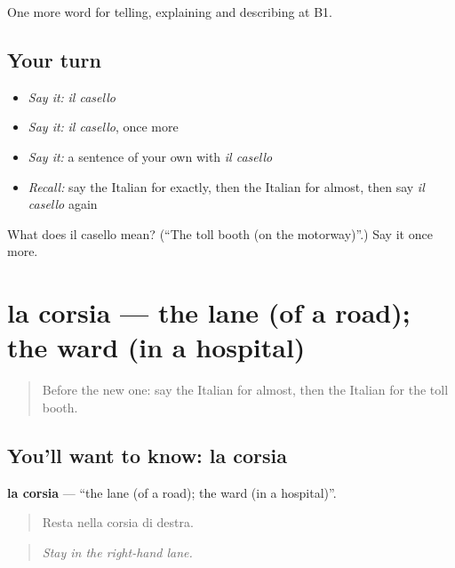 \begin{grammarlens}[title={What you've built}]
One more word for telling, explaining and describing at B1.
\end{grammarlens}

\subsection*{Your turn}
\begin{itemize}
\raggedright
  \item \emph{Say it:} \emph{il casello}
  \item \emph{Say it:} \emph{il casello}, once more
  \item \emph{Say it:} a sentence of your own with \emph{il casello}
  \item \emph{Recall:} say the Italian for exactly, then the Italian for almost, then say \emph{il casello} again
\end{itemize}

\begin{tcolorbox}[breakable,colback=teal!4,colframe=teal!35!black,title={Before you move on}]
What does il casello mean? (\textquotedblleft{}The toll booth (on the motorway)\textquotedblright{}.) Say it once more.
\end{tcolorbox}
\section[la corsia]{la corsia — the lane (of a road); the ward (in a hospital)}

\label{lesson:IT-C405-corsia}



\begin{quote}
Before the new one: say the Italian for almost, then the Italian for the toll booth.
\end{quote}

\subsection*{You'll want to know: la corsia}
\textbf{la corsia} — \textquotedblleft{}the lane (of a road); the ward (in a hospital)\textquotedblright{}.

\begin{quote}
Resta nella corsia di destra.
\end{quote}

\begin{quote}
\emph{Stay in the right-hand lane.}
\end{quote}

